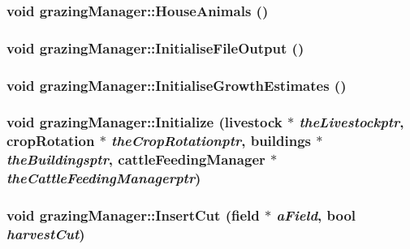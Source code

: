 \label{classgrazing_manager_a9838ae6a2502cdcd82be4915c358f339}
\hypertarget{classgrazing_manager_a0790c1be6eea4fbc391a89814b7dac99}{
\subsubsection[{HouseAnimals}]{\setlength{\rightskip}{0pt plus 5cm}void grazingManager::HouseAnimals ()}}
\label{classgrazing_manager_a0790c1be6eea4fbc391a89814b7dac99}
\hypertarget{classgrazing_manager_a2facc8dfbfbbcd8f9fec21fe5d58c942}{
\subsubsection[{InitialiseFileOutput}]{\setlength{\rightskip}{0pt plus 5cm}void grazingManager::InitialiseFileOutput ()}}
\label{classgrazing_manager_a2facc8dfbfbbcd8f9fec21fe5d58c942}
\hypertarget{classgrazing_manager_a65c9a2762d9760f899bba4cb65b1e024}{
\subsubsection[{InitialiseGrowthEstimates}]{\setlength{\rightskip}{0pt plus 5cm}void grazingManager::InitialiseGrowthEstimates ()}}
\label{classgrazing_manager_a65c9a2762d9760f899bba4cb65b1e024}
\hypertarget{classgrazing_manager_a8929fd866876ba054eeeb2dfd02e688b}{
\subsubsection[{Initialize}]{\setlength{\rightskip}{0pt plus 5cm}void grazingManager::Initialize ({\bf livestock} $\ast$ {\em theLivestockptr}, \/  {\bf cropRotation} $\ast$ {\em theCropRotationptr}, \/  {\bf buildings} $\ast$ {\em theBuildingsptr}, \/  {\bf cattleFeedingManager} $\ast$ {\em theCattleFeedingManagerptr})}}
\label{classgrazing_manager_a8929fd866876ba054eeeb2dfd02e688b}
\hypertarget{classgrazing_manager_a6f01332621905d316bb39c5f51169dd9}{
\subsubsection[{InsertCut}]{\setlength{\rightskip}{0pt plus 5cm}void grazingManager::InsertCut ({\bf field} $\ast$ {\em aField}, \/  bool {\em harvestCut})}}
